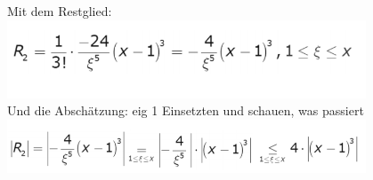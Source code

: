 \documentclass[12pt,a4paper]{article}
\begin{document}
Mit dem Restglied:\\
\includegraphics[width=0.8\textwidth]{BIlder/V1/27.png}\\
Und die Abschätzung: eig 1 Einsetzten und schauen, was passiert\\
\includegraphics[width=0.8\textwidth]{BIlder/V1/28.png}\\
\newpage
\end{document}
